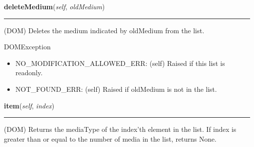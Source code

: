     \label{cssutils:stylesheets:medialist:MediaList:deleteMedium}

    \vspace{0.5ex}

\hspace{.8\funcindent}\begin{boxedminipage}{\funcwidth}

    \raggedright \textbf{deleteMedium}(\textit{self}, \textit{oldMedium})

    \vspace{-1.5ex}

    \rule{\textwidth}{0.5\fboxrule}
\setlength{\parskip}{2ex}

(DOM)
Deletes the medium indicated by oldMedium from the list.

DOMException
\begin{itemize}
\item {} 
NO{\_}MODIFICATION{\_}ALLOWED{\_}ERR: (self)
Raised if this list is readonly.

\item {} 
NOT{\_}FOUND{\_}ERR: (self)
Raised if oldMedium is not in the list.

\end{itemize}
\setlength{\parskip}{1ex}
    \end{boxedminipage}

    \label{cssutils:stylesheets:medialist:MediaList:item}

    \vspace{0.5ex}

\hspace{.8\funcindent}\begin{boxedminipage}{\funcwidth}

    \raggedright \textbf{item}(\textit{self}, \textit{index})

    \vspace{-1.5ex}

    \rule{\textwidth}{0.5\fboxrule}
\setlength{\parskip}{2ex}

(DOM)
Returns the mediaType of the index'th element in the list.
If index is greater than or equal to the number of media in the
list, returns None.
\setlength{\parskip}{1ex}
    \end{boxedminipage}

